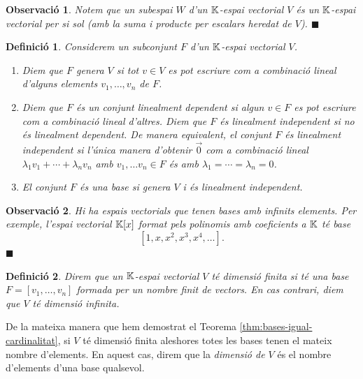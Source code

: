 \documentclass[
  11pt,
]{book}
\numberwithin{dummy}{section}
\theoremstyle{maincolornumbox}
\newtheorem{remarkT}{Observació}[chapter]
\theoremstyle{blacknumex}
\theoremstyle{blacknumbox}
\newtheorem{definitionT}{Definició}[chapter]
\theoremstyle{maincolornum}
\newenvironment{definition}{\begin{dBox}\begin{definitionT}}{\end{definitionT}\end{dBox}}
\newenvironment{remark}{\begin{remarkT}}{\hfill{\tiny\ensuremath{\blacksquare}}\end{remarkT}}
\newlength\esp
\begin{document}
\begin{remark}
Notem que un subespai \(W\) d'un \(\mathbb{K}\)-espai vectorial \(V\) és un \(\mathbb{K}\)-espai
vectorial per si sol (amb la suma i producte per escalars heredat de
\(V\)).
\end{remark}

\begin{definition}

Considerem un subconjunt \(F\) d'un \(\mathbb{K}\)-espai vectorial \(V\).

\begin{enumerate}
\def\labelenumi{\arabic{enumi}.}
\item
  Diem que \(F\) \emph{genera} \(V\) si tot \(v\in V\) es pot escriure com a
  combinació lineal d'alguns elements \(v_1,\ldots, v_n\) de \(F\).
\item
  Diem que \(F\) és un conjunt \emph{linealment dependent} si algun \(v\in F\)
  es pot escriure com a combinació lineal d'altres. Diem que \(F\) és
  \emph{linealment independent} si no és linealment dependent. De manera
  equivalent, el conjunt \(F\) és linealment independent si l'única
  manera d'obtenir \(\vec 0\) com a combinació lineal
  \(\lambda_1v_1+\cdots+ \lambda_nv_n\) amb \(v_1,\ldots v_n\in F\) és amb
  \(\lambda_1=\cdots=\lambda_n=0\).
\item
  El conjunt \(F\) és una \emph{base} si genera \(V\) i és linealment
  independent.
\end{enumerate}

\end{definition}

\begin{remark}
Hi ha espais vectorials que tenen bases amb infinits elements. Per
exemple, l'espai vectorial \(\mathbb{K}[x]\) format pels polinomis amb coeficients
a \(\mathbb{K}\) té base \[[1,x,x^2,x^3,x^4,\ldots].\]
\end{remark}

\begin{definition}
Direm que un \(\mathbb{K}\)-espai vectorial \(V\) té \emph{dimensió finita} si té una
base \(F=[v_1,\ldots,v_n]\) formada per un nombre finit de vectors. En cas
contrari, diem que \(V\) té \emph{dimensió infinita}.
\end{definition}

De la mateixa manera que hem demostrat el
Teorema \ref{thm:bases-igual-cardinalitat}, si \(V\) té dimensió finita
aleshores totes les bases tenen el mateix nombre d'elements. En aquest
cas, direm que la \emph{dimensió de \(V\)} és el nombre d'elements d'una base
qualsevol.
\end{document}
